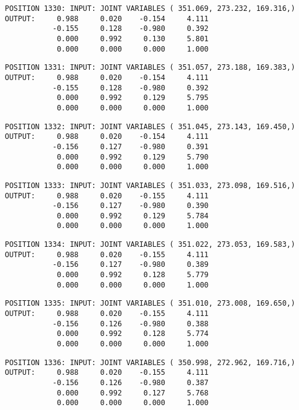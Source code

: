 \begin{verbatim}
POSITION 1330: INPUT: JOINT VARIABLES ( 351.069, 273.232, 169.316,)
OUTPUT:     0.988     0.020    -0.154     4.111
           -0.155     0.128    -0.980     0.392
            0.000     0.992     0.130     5.801
            0.000     0.000     0.000     1.000
\end{verbatim} \pagebreak[1]\begin{verbatim}
POSITION 1331: INPUT: JOINT VARIABLES ( 351.057, 273.188, 169.383,)
OUTPUT:     0.988     0.020    -0.154     4.111
           -0.155     0.128    -0.980     0.392
            0.000     0.992     0.129     5.795
            0.000     0.000     0.000     1.000
\end{verbatim} \pagebreak[1]\begin{verbatim}
POSITION 1332: INPUT: JOINT VARIABLES ( 351.045, 273.143, 169.450,)
OUTPUT:     0.988     0.020    -0.154     4.111
           -0.156     0.127    -0.980     0.391
            0.000     0.992     0.129     5.790
            0.000     0.000     0.000     1.000
\end{verbatim} \pagebreak[1]\begin{verbatim}
POSITION 1333: INPUT: JOINT VARIABLES ( 351.033, 273.098, 169.516,)
OUTPUT:     0.988     0.020    -0.155     4.111
           -0.156     0.127    -0.980     0.390
            0.000     0.992     0.129     5.784
            0.000     0.000     0.000     1.000
\end{verbatim} \pagebreak[1]\begin{verbatim}
POSITION 1334: INPUT: JOINT VARIABLES ( 351.022, 273.053, 169.583,)
OUTPUT:     0.988     0.020    -0.155     4.111
           -0.156     0.127    -0.980     0.389
            0.000     0.992     0.128     5.779
            0.000     0.000     0.000     1.000
\end{verbatim} \pagebreak[1]\begin{verbatim}
POSITION 1335: INPUT: JOINT VARIABLES ( 351.010, 273.008, 169.650,)
OUTPUT:     0.988     0.020    -0.155     4.111
           -0.156     0.126    -0.980     0.388
            0.000     0.992     0.128     5.774
            0.000     0.000     0.000     1.000
\end{verbatim} \pagebreak[1]\begin{verbatim}
POSITION 1336: INPUT: JOINT VARIABLES ( 350.998, 272.962, 169.716,)
OUTPUT:     0.988     0.020    -0.155     4.111
           -0.156     0.126    -0.980     0.387
            0.000     0.992     0.127     5.768
            0.000     0.000     0.000     1.000
\end{verbatim} \pagebreak[1]\begin{verbatim}

\end{verbatim}
